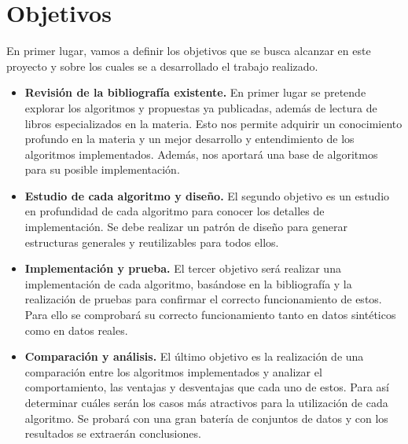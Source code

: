 \section{Objetivos}
En primer lugar, vamos a definir los objetivos que se busca alcanzar en este 
proyecto y sobre los cuales se a desarrollado el trabajo realizado.
\begin{itemize}
    \item \textbf{Revisión de la bibliografía existente.} En primer lugar
    se pretende explorar los algoritmos y propuestas ya publicadas, además de
    lectura de libros especializados en la materia. Esto nos permite
    adquirir un conocimiento profundo en la materia y un
    mejor desarrollo y entendimiento de los algoritmos implementados.
    Además, nos aportará una base de algoritmos para su posible implementación.

    \item \textbf{Estudio de cada algoritmo y diseño.} El segundo objetivo es un 
    estudio en profundidad de cada algoritmo para conocer los detalles de
    implementación. Se debe realizar un patrón de diseño para generar
    estructuras generales y reutilizables para todos ellos.

    \item \textbf{Implementación y prueba.} El tercer objetivo será
    realizar una implementación de cada algoritmo, basándose en la
    bibliografía y la realización de pruebas para confirmar el correcto
    funcionamiento de estos. Para ello se comprobará su correcto funcionamiento
    tanto en datos sintéticos como en datos reales.

    \item \textbf{Comparación y análisis.} El último objetivo es la
    realización de una comparación entre los algoritmos implementados y 
    analizar el comportamiento, las ventajas y desventajas que cada uno
    de estos. Para así determinar cuáles serán los casos más atractivos para
    la utilización de cada algoritmo. Se probará con una gran
    batería de conjuntos de datos y con los resultados se extraerán conclusiones.
\end{itemize}



